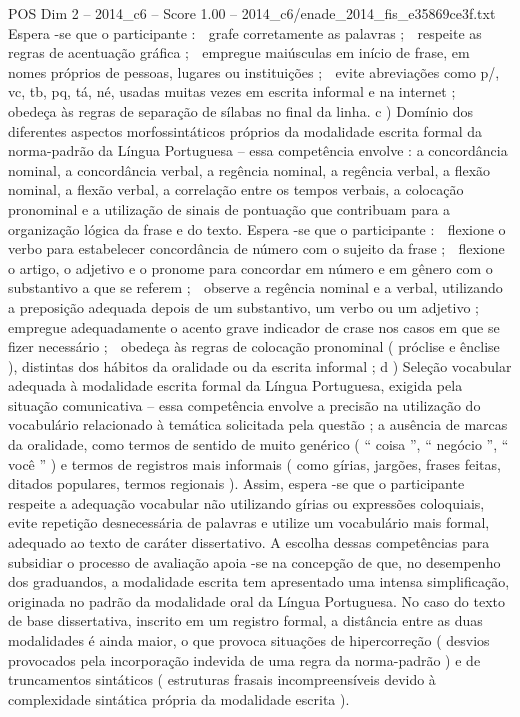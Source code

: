 \begin{textsample}{POS Dim 2 – 2014\_c6 – Score 1.00 – 2014\_c6/enade\_2014\_fis\_e35869ce3f.txt}
Espera -se que o participante :  grafe corretamente as palavras ;  respeite as regras de acentuação gráfica ;  empregue maiúsculas em início de frase, em nomes próprios de pessoas, lugares ou instituições ;  evite abreviações como p/, vc, tb, pq, tá, né, usadas muitas vezes em escrita informal e na internet ;  obedeça às regras de separação de sílabas no final da linha. c ) Domínio dos diferentes aspectos morfossintáticos próprios da modalidade escrita formal da norma-padrão da Língua Portuguesa – essa competência envolve : a concordância nominal, a concordância verbal, a regência nominal, a regência verbal, a flexão nominal, a flexão verbal, a correlação entre os tempos verbais, a colocação pronominal e a utilização de sinais de pontuação que contribuam para a organização lógica da frase e do texto.
Espera -se que o participante :  flexione o verbo para estabelecer concordância de número com o sujeito da frase ;  flexione o artigo, o adjetivo e o pronome para concordar em número e em gênero com o substantivo a que se referem ;  observe a regência nominal e a verbal, utilizando a preposição adequada depois de um substantivo, um verbo ou um adjetivo ;  empregue adequadamente o acento grave indicador de crase nos casos em que se fizer necessário ;  obedeça às regras de colocação pronominal ( próclise e ênclise ), distintas dos hábitos da oralidade ou da escrita informal ; d ) Seleção vocabular adequada à modalidade escrita formal da Língua Portuguesa, exigida pela situação comunicativa – essa competência envolve a precisão na utilização do vocabulário relacionado à temática solicitada pela questão ; a ausência de marcas da oralidade, como termos de sentido de muito genérico ( “ coisa ”, “ negócio ”, “ você ” ) e termos de registros mais informais ( como gírias, jargões, frases feitas, ditados populares, termos regionais ).
Assim, espera -se que o participante respeite a adequação vocabular não utilizando gírias ou expressões coloquiais, evite repetição desnecessária de palavras e utilize um vocabulário mais formal, adequado ao texto de caráter dissertativo.
A escolha dessas competências para subsidiar o processo de avaliação apoia -se na concepção de que, no desempenho dos graduandos, a modalidade escrita tem apresentado uma intensa simplificação, originada no padrão da modalidade oral da Língua Portuguesa.
No caso do texto de base dissertativa, inscrito em um registro formal, a distância entre as duas modalidades é ainda maior, o que provoca situações de hipercorreção ( desvios provocados pela incorporação indevida de uma regra da norma-padrão ) e de truncamentos sintáticos ( estruturas frasais incompreensíveis devido à complexidade sintática própria da modalidade escrita ).

\end{textsample}
